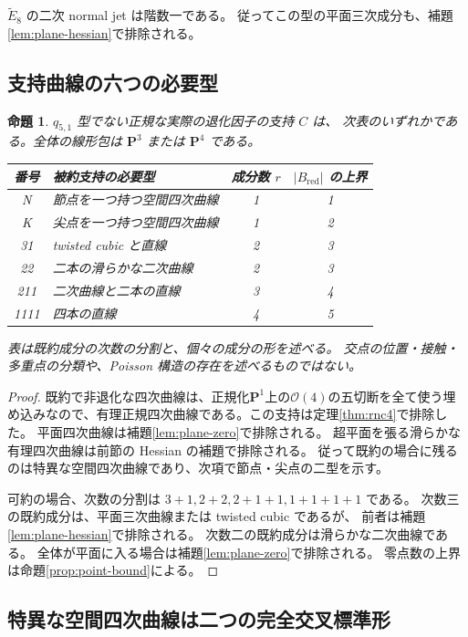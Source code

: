 \documentclass[11pt,a4paper]{ltjsarticle}
\newcommand{\PP}{\mathbf P}\renewcommand{\AA}{\mathbf A}
\newcommand{\OO}{\mathcal O}\newcommand{\FF}{\mathcal F}
\newtheorem{proposition}[theorem]{命題}
\theoremstyle{remark}\newtheorem{remark}[theorem]{注意}
\begin{document}
$\widetilde E_8$ の二次 normal jet は階数一である。
従ってこの型の平面三次成分も、補題\ref{lem:plane-hessian}で排除される。

\subsection{支持曲線の六つの必要型}

\begin{proposition}\label{prop:six}
$q_{5,1}$ 型でない正規な実際の退化因子の支持 $C$ は、
次表のいずれかである。全体の線形包は $\PP^3$ または $\PP^4$ である。
\begin{center}
\begin{tabular}{@{}clcc@{}}
\toprule
番号 & 被約支持の必要型 & 成分数 $r$ & $|B_{\mathrm{red}}|$ の上界\\
\midrule
N & 節点を一つ持つ空間四次曲線 & 1 & 1\\
K & 尖点を一つ持つ空間四次曲線 & 1 & 2\\
31 & twisted cubic と直線 & 2 & 3\\
22 & 二本の滑らかな二次曲線 & 2 & 3\\
211 & 二次曲線と二本の直線 & 3 & 4\\
1111 & 四本の直線 & 4 & 5\\
\bottomrule
\end{tabular}
\end{center}
表は既約成分の次数の分割と、個々の成分の形を述べる。
交点の位置・接触・多重点の分類や、Poisson 構造の存在を述べるものではない。
\end{proposition}
\begin{proof}
既約で非退化な四次曲線は、正規化$\PP^1$上の$\OO(4)$の五切断を全て使う埋め込みなので、有理正規四次曲線である。この支持は定理\ref{thm:rnc4}で排除した。
平面四次曲線は補題\ref{lem:plane-zero}で排除される。
超平面を張る滑らかな有理四次曲線は前節の Hessian の補題で排除される。
従って既約の場合に残るのは特異な空間四次曲線であり、次項で節点・尖点の二型を示す。

可約の場合、次数の分割は $3+1,2+2,2+1+1,1+1+1+1$ である。
次数三の既約成分は、平面三次曲線または twisted cubic であるが、
前者は補題\ref{lem:plane-hessian}で排除される。
次数二の既約成分は滑らかな二次曲線である。
全体が平面に入る場合は補題\ref{lem:plane-zero}で排除される。
零点数の上界は命題\ref{prop:point-bound}による。
\end{proof}

\subsection{特異な空間四次曲線は二つの完全交叉標準形}
\end{document}
